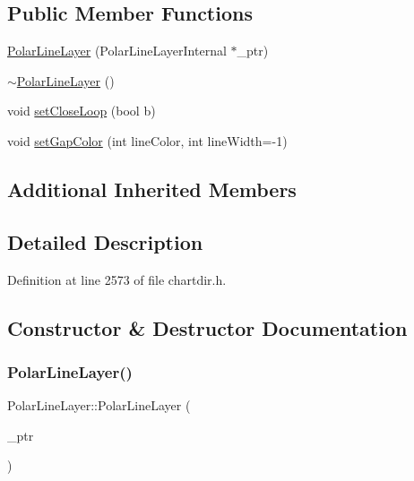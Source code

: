 \subsection*{Public Member Functions}
\begin{DoxyCompactItemize}
\item 
\hyperlink{class_polar_line_layer_ab9129f150da16b9c8f0352f72965fb2d}{Polar\+Line\+Layer} (Polar\+Line\+Layer\+Internal $\ast$\+\_\+ptr)
\item 
\hyperlink{class_polar_line_layer_a582d7c1441855106bc5f7000d2ea1cf7}{$\sim$\+Polar\+Line\+Layer} ()
\item 
void \hyperlink{class_polar_line_layer_a2d55cd0511bd1d9f61ab9668e3feaffc}{set\+Close\+Loop} (bool b)
\item 
void \hyperlink{class_polar_line_layer_ae432217ae01c5d8f79d2be7c4eb70c4c}{set\+Gap\+Color} (int line\+Color, int line\+Width=-\/1)
\end{DoxyCompactItemize}
\subsection*{Additional Inherited Members}


\subsection{Detailed Description}


Definition at line 2573 of file chartdir.\+h.



\subsection{Constructor \& Destructor Documentation}
\mbox{\label{class_polar_line_layer_ab9129f150da16b9c8f0352f72965fb2d}} 
\subsubsection{\texorpdfstring{Polar\+Line\+Layer()}{PolarLineLayer()}}
{\footnotesize\ttfamily Polar\+Line\+Layer\+::\+Polar\+Line\+Layer (\begin{DoxyParamCaption}\item[{Polar\+Line\+Layer\+Internal $\ast$}]{\+\_\+ptr }\end{DoxyParamCaption})\hspace{0.3cm}{\ttfamily [inline]}}



